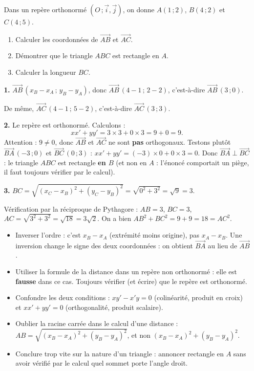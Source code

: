 \documentclass[11pt]{article}
\begin{document}
\begin{exoresolu}
Dans un repère orthonormé $(O\,;\vec{i},\vec{j})$, on donne $A(1\,;2)$, $B(4\,;2)$ et $C(4\,;5)$.
\begin{enumerate}
  \item Calculer les coordonnées de $\overrightarrow{AB}$ et $\overrightarrow{AC}$.
  \item Démontrer que le triangle $ABC$ est rectangle en $A$.
  \item Calculer la longueur $BC$.
\end{enumerate}
\tcblower
\textbf{1.} $\overrightarrow{AB}\,(x_B-x_A\,;\,y_B-y_A)$, donc $\overrightarrow{AB}\,(4-1\,;\,2-2)$, c'est-à-dire $\overrightarrow{AB}\,(3\,;0)$.

De même, $\overrightarrow{AC}\,(4-1\,;\,5-2)$, c'est-à-dire $\overrightarrow{AC}\,(3\,;3)$.

\textbf{2.} Le repère est orthonormé. Calculons :
\[ xx'+yy' = 3\times 3 + 0\times 3 = 9 + 0 = 9. \]
Attention : $9\neq 0$, donc $\overrightarrow{AB}$ et $\overrightarrow{AC}$ ne sont \textbf{pas} orthogonaux. Testons plutôt $\overrightarrow{BA}\,(-3\,;0)$ et $\overrightarrow{BC}\,(0\,;3)$ : $xx'+yy'=(-3)\times 0+0\times 3=0$. Donc $\overrightarrow{BA}\perp\overrightarrow{BC}$ : le triangle $ABC$ est rectangle \textbf{en $B$} (et non en $A$ : l'énoncé comportait un piège, il faut toujours vérifier par le calcul).

\textbf{3.} $BC=\sqrt{(x_C-x_B)^2+(y_C-y_B)^2}=\sqrt{0^2+3^2}=\sqrt{9}=3$.

Vérification par la réciproque de Pythagore : $AB=3$, $BC=3$, $AC=\sqrt{3^2+3^2}=\sqrt{18}=3\sqrt{2}$. On a bien $AB^2+BC^2=9+9=18=AC^2$.
\end{exoresolu}

\begin{attention}
\begin{itemize}
  \item Inverser l'ordre : c'est $x_B-x_A$ (extrémité moins origine), pas $x_A-x_B$. Une inversion change le signe des deux coordonnées : on obtient $\overrightarrow{BA}$ au lieu de $\overrightarrow{AB}$.
  \item Utiliser la formule de la distance dans un repère non orthonormé : elle est \textbf{fausse} dans ce cas. Toujours vérifier (et écrire) que le repère est orthonormé.
  \item Confondre les deux conditions : $xy'-x'y=0$ (colinéarité, produit en croix) et $xx'+yy'=0$ (orthogonalité, produit scalaire).
  \item Oublier la racine carrée dans le calcul d'une distance : $AB=\sqrt{(x_B-x_A)^2+(y_B-y_A)^2}$, et non $(x_B-x_A)^2+(y_B-y_A)^2$.
  \item Conclure trop vite sur la nature d'un triangle : annoncer \og rectangle en $A$ \fg{} sans avoir vérifié par le calcul quel sommet porte l'angle droit.
\end{itemize}
\end{attention}
\end{document}
